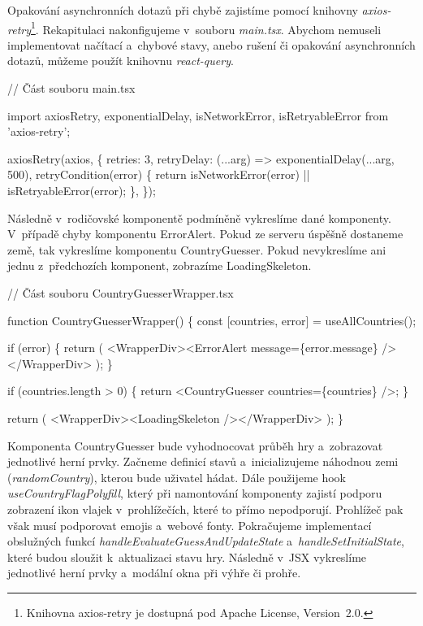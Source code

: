 Opakování asynchronních dotazů při chybě zajistíme pomocí knihovny \emph{axios-retry}\footnote{Knihovna axios-retry je dostupná pod Apache License, Version~2.0.\cite{axiosretrylib}}. 
Rekapitulaci nakonfigujeme v~souboru \emph{main.tsx}. 
Abychom nemuseli implementovat načítací a~chybové stavy, anebo rušení či opakování asynchronních dotazů, můžeme použít knihovnu \emph{react-query}.

\begin{prog}
// Část souboru main.tsx

import axiosRetry, {exponentialDelay, isNetworkError, isRetryableError}
from 'axios-retry';

axiosRetry(axios, \{
  retries: 3,
  retryDelay: (...arg) => exponentialDelay(...arg, 500),
  retryCondition(error) \{
    return isNetworkError(error) || isRetryableError(error);
  \},
\});
\end{prog}

Následně v~rodičovské komponentě podmíněně vykreslíme dané komponenty. V~případě chyby komponentu ErrorAlert. Pokud ze serveru úspěšně dostaneme země, tak vykreslíme komponentu CountryGuesser. 
Pokud nevykreslíme ani jednu z~předchozích komponent, zobrazíme LoadingSkeleton.

\begin{prog}
// Část souboru CountryGuesserWrapper.tsx

function CountryGuesserWrapper() \{
  const [countries, error] = useAllCountries();

  if (error) \{
    return (
      <WrapperDiv><ErrorAlert message=\{error.message\} /></WrapperDiv>
    );
  \}

  if (countries.length > 0) \{
    return <CountryGuesser countries=\{countries\} />;
  \}

  return (
    <WrapperDiv><LoadingSkeleton /></WrapperDiv>
  );
\}
\end{prog}

Komponenta CountryGuesser bude vyhodnocovat průběh hry a~zobrazovat jednotlivé herní prvky. Začneme definicí stavů a~inicializujeme náhodnou zemi (\emph{randomCountry}), kterou bude uživatel hádat. 
Dále použijeme hook \emph{useCountryFlagPolyfill}, který při namontování komponenty zajistí podporu zobrazení ikon vlajek v~prohlížečích, které to přímo nepodporují. 
Prohlížeč pak však musí podporovat emojis a~webové fonty. Pokračujeme implementací obslužných funkcí \emph{handleEvaluateGuessAndUpdateState} a~\emph{handleSetInitialState}, které budou sloužit k~aktualizaci stavu hry. 
Následně v~JSX vykreslíme jednotlivé herní prvky a~modální okna při výhře či prohře.

